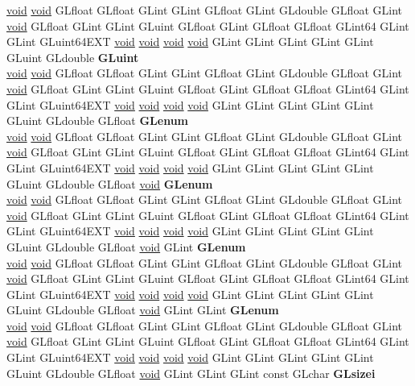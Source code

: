 \begin{DoxyCompactItemize}
\begin{tabbing}
\>\hyperlink{interfacevoid}{void} \hyperlink{interfacevoid}{void} GLfloat GLfloat GLint GLint GLfloat GLint GLdouble GLfloat GLint \hyperlink{interfacevoid}{void} GLfloat GLint GLint GLuint GLfloat GLint GLfloat GLfloat GLint64 GLint GLint GLuint64EXT \hyperlink{interfacevoid}{void} \hyperlink{interfacevoid}{void} \hyperlink{interfacevoid}{void} \hyperlink{interfacevoid}{void} GLint GLint GLint GLint GLint GLuint GLdouble {\bfseries GLuint}\\
\>\hyperlink{interfacevoid}{void} \hyperlink{interfacevoid}{void} GLfloat GLfloat GLint GLint GLfloat GLint GLdouble GLfloat GLint \hyperlink{interfacevoid}{void} GLfloat GLint GLint GLuint GLfloat GLint GLfloat GLfloat GLint64 GLint GLint GLuint64EXT \hyperlink{interfacevoid}{void} \hyperlink{interfacevoid}{void} \hyperlink{interfacevoid}{void} \hyperlink{interfacevoid}{void} GLint GLint GLint GLint GLint GLuint GLdouble GLfloat {\bfseries GLenum}\\
\>\hyperlink{interfacevoid}{void} \hyperlink{interfacevoid}{void} GLfloat GLfloat GLint GLint GLfloat GLint GLdouble GLfloat GLint \hyperlink{interfacevoid}{void} GLfloat GLint GLint GLuint GLfloat GLint GLfloat GLfloat GLint64 GLint GLint GLuint64EXT \hyperlink{interfacevoid}{void} \hyperlink{interfacevoid}{void} \hyperlink{interfacevoid}{void} \hyperlink{interfacevoid}{void} GLint GLint GLint GLint GLint GLuint GLdouble GLfloat \hyperlink{interfacevoid}{void} {\bfseries GLenum}\\
\>\hyperlink{interfacevoid}{void} \hyperlink{interfacevoid}{void} GLfloat GLfloat GLint GLint GLfloat GLint GLdouble GLfloat GLint \hyperlink{interfacevoid}{void} GLfloat GLint GLint GLuint GLfloat GLint GLfloat GLfloat GLint64 GLint GLint GLuint64EXT \hyperlink{interfacevoid}{void} \hyperlink{interfacevoid}{void} \hyperlink{interfacevoid}{void} \hyperlink{interfacevoid}{void} GLint GLint GLint GLint GLint GLuint GLdouble GLfloat \hyperlink{interfacevoid}{void} GLint {\bfseries GLenum}\\
\>\hyperlink{interfacevoid}{void} \hyperlink{interfacevoid}{void} GLfloat GLfloat GLint GLint GLfloat GLint GLdouble GLfloat GLint \hyperlink{interfacevoid}{void} GLfloat GLint GLint GLuint GLfloat GLint GLfloat GLfloat GLint64 GLint GLint GLuint64EXT \hyperlink{interfacevoid}{void} \hyperlink{interfacevoid}{void} \hyperlink{interfacevoid}{void} \hyperlink{interfacevoid}{void} GLint GLint GLint GLint GLint GLuint GLdouble GLfloat \hyperlink{interfacevoid}{void} GLint GLint {\bfseries GLenum}\\
\>\hyperlink{interfacevoid}{void} \hyperlink{interfacevoid}{void} GLfloat GLfloat GLint GLint GLfloat GLint GLdouble GLfloat GLint \hyperlink{interfacevoid}{void} GLfloat GLint GLint GLuint GLfloat GLint GLfloat GLfloat GLint64 GLint GLint GLuint64EXT \hyperlink{interfacevoid}{void} \hyperlink{interfacevoid}{void} \hyperlink{interfacevoid}{void} \hyperlink{interfacevoid}{void} GLint GLint GLint GLint GLint GLuint GLdouble GLfloat \hyperlink{interfacevoid}{void} GLint GLint GLint const GLchar {\bfseries GLsizei}\\

\end{tabbing}
\end{DoxyCompactItemize}
